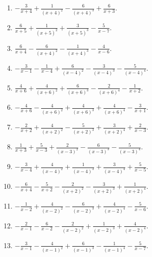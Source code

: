 \documentclass[11pt,oneside]{book}
\begin{document}
\begin{enumerate}[leftmargin=*,label=\textbf{V\arabic*.},itemsep=0.45\baselineskip]
\item $\displaystyle - \frac{3}{x + 4} + \frac{1}{\left(x + 4\right)^{2}} - \frac{6}{\left(x + 4\right)^{3}} + \frac{6}{x + 3}$.
\item $\displaystyle \frac{6}{x + 5} + \frac{1}{\left(x + 5\right)^{2}} + \frac{3}{\left(x + 5\right)^{3}} - \frac{5}{x - 7}$.
\item $\displaystyle \frac{6}{x + 4} - \frac{6}{\left(x + 4\right)^{2}} - \frac{1}{\left(x + 4\right)^{3}} - \frac{4}{x - 6}$.
\item $\displaystyle - \frac{3}{x - 1} - \frac{1}{x - 4} + \frac{6}{\left(x - 4\right)^{2}} - \frac{3}{\left(x - 4\right)^{3}} - \frac{5}{\left(x - 4\right)^{4}}$.
\item $\displaystyle \frac{4}{x + 6} + \frac{4}{\left(x + 6\right)^{2}} + \frac{6}{\left(x + 6\right)^{3}} - \frac{2}{\left(x + 6\right)^{4}} - \frac{1}{x + 2}$.
\item $\displaystyle - \frac{4}{x + 6} - \frac{4}{\left(x + 6\right)^{2}} + \frac{4}{\left(x + 6\right)^{3}} + \frac{4}{\left(x + 6\right)^{4}} - \frac{3}{x + 1}$.
\item $\displaystyle - \frac{2}{x + 2} + \frac{4}{\left(x + 2\right)^{2}} - \frac{5}{\left(x + 2\right)^{3}} + \frac{3}{\left(x + 2\right)^{4}} + \frac{2}{x - 3}$.
\item $\displaystyle \frac{1}{x + 3} + \frac{5}{x - 3} + \frac{2}{\left(x - 3\right)^{2}} - \frac{6}{\left(x - 3\right)^{3}} - \frac{5}{\left(x - 3\right)^{4}}$.
\item $\displaystyle - \frac{3}{x - 4} + \frac{4}{\left(x - 4\right)^{2}} + \frac{1}{\left(x - 4\right)^{3}} + \frac{3}{\left(x - 4\right)^{4}} + \frac{5}{x - 5}$.
\item $\displaystyle - \frac{6}{x + 4} - \frac{5}{x + 2} - \frac{2}{\left(x + 2\right)^{2}} - \frac{3}{\left(x + 2\right)^{3}} + \frac{1}{\left(x + 2\right)^{4}}$.
\item $\displaystyle - \frac{1}{x - 2} + \frac{4}{\left(x - 2\right)^{2}} - \frac{6}{\left(x - 2\right)^{3}} + \frac{4}{\left(x - 2\right)^{4}} - \frac{5}{x - 6}$.
\item $\displaystyle - \frac{2}{x - 1} - \frac{6}{x - 2} - \frac{2}{\left(x - 2\right)^{2}} + \frac{1}{\left(x - 2\right)^{3}} + \frac{4}{\left(x - 2\right)^{4}}$.
\item $\displaystyle - \frac{3}{x - 1} - \frac{4}{\left(x - 1\right)^{2}} + \frac{6}{\left(x - 1\right)^{3}} - \frac{1}{\left(x - 1\right)^{4}} - \frac{5}{x - 7}$.
\end{enumerate}
\end{document}
